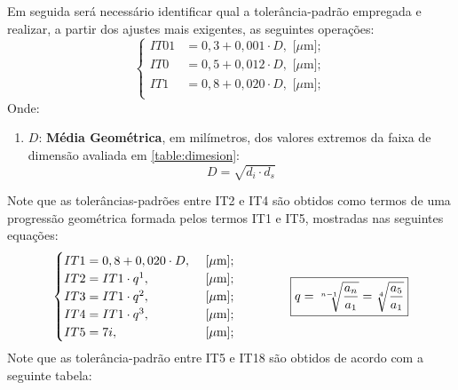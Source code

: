 \documentclass{article}
\begin{document}
            Em seguida será necessário identificar qual a tolerância-padrão empregada e realizar, a partir dos ajustes mais exigentes, as seguintes operações:
                \[
                    \begin{cases}
                        IT01 &= 0,3 + 0,001 \cdot D, \text{ [$\mu$m]};\\
                        IT0  &= 0,5 + 0,012 \cdot D, \text{ [$\mu$m]};\\
                        IT1  &= 0,8 + 0,020 \cdot D, \text{ [$\mu$m]};\\
                    \end{cases}
                \]
            Onde:
                \begin{enumerate}[noitemsep]
                    \item $D$: \textbf{Média Geométrica}, em milímetros, dos valores extremos da faixa de dimensão avaliada em \ref{table:dimesion}:
                        \begin{equation}
                            \boxed{
                                D = \sqrt{d_{i} \cdot d_{s}}
                            }
                        \end{equation}
                \end{enumerate}
            Note que as tolerâncias-padrões entre IT2 e IT4 são obtidos como termos de uma progressão geométrica formada pelos termos IT1 e IT5, mostradas nas seguintes equações:
                \[
                    \begin{cases}
                        IT1 = 0,8 + 0,020 \cdot D, & \text{ [$\mu$m]};\\
                        IT2 = IT1 \cdot q^{1},     & \text{ [$\mu$m]};\\
                        IT3 = IT1 \cdot q^{2},     & \text{ [$\mu$m]};\\
                        IT4 = IT1 \cdot q^{3},     & \text{ [$\mu$m]};\\
                        IT5 = 7i,                  & \text{ [$\mu$m]};\\
                    \end{cases}
                    \hspace{15mm}
                    \boxed{
                        q = \sqrt[n-1]{\frac{a_{n}}{a_{1}}} = \sqrt[4]{\frac{a_{5}}{a_{1}}}
                    }
                \]
            Note que as tolerância-padrão entre IT5 e IT18 são obtidos de acordo com a seguinte tabela:
\end{document}
